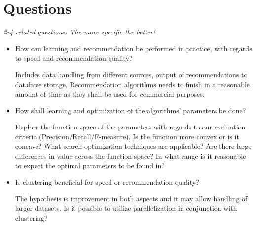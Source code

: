 
\section{Questions}\label{sec:intro:questions}

\textit{2-4 related questions. The more specific the better!}

\begin{itemize}
    \item How can learning and recommendation be performed in practice, with regards to speed and recommendation quality?

          Includes data handling from different sources, output of recommendations to database storage. Recommendation algorithms needs to finish in a reasonable amount of time as they shall be used for commercial purposes.

    \item How shall learning and optimization of the algorithms' parameters be done?

          Explore the function space of the parameters with regards to our evaluation criteria (Precision/Recall/F-measure). Is the function more convex or is it concave? What search optimization techniques are applicable? Are there large differences in value across the function space? In what range is it reasonable to expect the optimal parameters to be found in?

    \item Is clustering beneficial for speed or recommendation quality?

          The hypothesis is improvement in both aspects and it may allow handling of larger datasets.
          Is it possible to utilize parallelization in conjunction with clustering?
\end{itemize}


